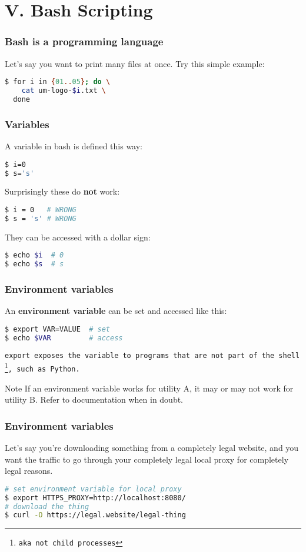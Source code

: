 \section{V. Bash Scripting}
\begin{frame}[fragile]
\frametitle{Bash is a programming language}
Let's say you want to print many files at once.
\newline \newline
Try this simple example:
\begin{lstlisting}[language=bash]
$ for i in {01..05}; do \
    cat um-logo-$i.txt \
  done
\end{lstlisting}
\end{frame}

\begin{frame}[fragile]
\frametitle{Variables}
A variable in bash is defined this way:
\begin{lstlisting}[language=bash]
$ i=0
$ s='s'
\end{lstlisting}
Surprisingly these do \textbf{not} work:
\begin{lstlisting}[language=bash]
$ i = 0   # WRONG
$ s = 's' # WRONG
\end{lstlisting}
They can be accessed with a dollar sign:
\begin{lstlisting}[language=bash]
$ echo $i  # 0
$ echo $s  # s
\end{lstlisting}
\end{frame}

\begin{frame}[fragile]
\frametitle{Environment variables}
An \textbf{environment variable} can be set and accessed like this:
\begin{lstlisting}[language=bash]
$ export VAR=VALUE  # set
$ echo $VAR         # access
\end{lstlisting}
\tt{export} exposes the variable to programs that are not part of the shell
\footnote{aka not child processes}, such as Python.
\begin{block}{Note}
    If an environment variable works for utility A, it may or may not work
    for utility B. Refer to documentation when in doubt.
\end{block}
\end{frame}

\begin{frame}[fragile]
\frametitle{Environment variables}
Let's say you're downloading something from a completely legal website,
and you want the traffic to go through your completely legal local proxy
for completely legal reasons.
\begin{lstlisting}[language=bash]
# set environment variable for local proxy
$ export HTTPS_PROXY=http://localhost:8080/
# download the thing
$ curl -O https://legal.website/legal-thing
\end{lstlisting}
\end{frame}

